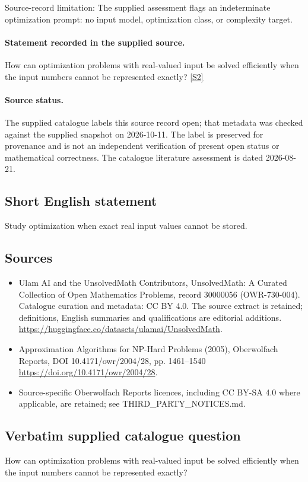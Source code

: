 \documentclass[11pt]{article}
\begin{document}
Source-record limitation: The supplied assessment flags an indeterminate optimization prompt: no input model, optimization class, or complexity target.
\paragraph{Statement recorded in the supplied source.}
How can optimization problems with real-valued input be solved efficiently when the input numbers cannot be represented exactly? \href{https://doi.org/10.4171/owr/2004/28}{[S2]}
\paragraph{Source status.}
The supplied catalogue labels this source record open; that metadata was checked against the supplied snapshot on 2026-10-11. The label is preserved for provenance and is not an independent verification of present open status or mathematical correctness. The catalogue literature assessment is dated 2026-08-21.
\subsection{Short English statement}
Study optimization when exact real input values cannot be stored.
\subsection{Sources}
\begin{itemize}
\item[S1] Ulam AI and the UnsolvedMath Contributors, UnsolvedMath: A Curated Collection of Open Mathematics Problems, record 30000056 (OWR-730-004). Catalogue curation and metadata: CC BY 4.0. The source extract is retained; definitions, English summaries and qualifications are editorial additions.
\url{https://huggingface.co/datasets/ulamai/UnsolvedMath}.
\item[S2] Approximation Algorithms for NP-Hard Problems (2005), Oberwolfach Reports, DOI 10.4171/owr/2004/28, pp. 1461--1540
\url{https://doi.org/10.4171/owr/2004/28}.
\item Source-specific Oberwolfach Reports licences, including CC BY-SA 4.0 where applicable, are retained; see THIRD\_PARTY\_NOTICES.md.
\end{itemize}
\subsection{Verbatim supplied catalogue question}
How can optimization problems with real-valued input be solved efficiently when the input numbers cannot be represented exactly?
\end{document}
